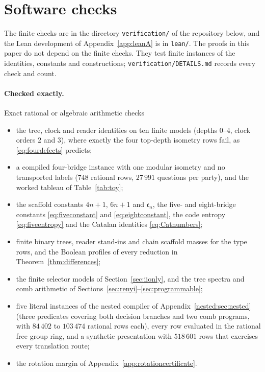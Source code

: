 \section{Software checks}\label{sec:repro}
The finite checks are in the directory \texttt{verification/} of the repository below, and the Lean development of Appendix~\ref{app:leanA} is in \texttt{lean/}. The proofs in this paper do not depend on the finite checks. They test finite instances of the identities, constants and constructions; \texttt{verification/DETAILS.md} records every check and count.

\centerline{\codearchive}

\paragraph{Checked exactly.} Exact rational or algebraic arithmetic checks
\begin{itemize}
\item the tree, clock and reader identities on ten finite models (depths $0$--$4$, clock orders $2$ and $3$), where exactly the four top-depth isometry rows fail, as \eqref{eq:fourdefects} predicts;
\item a compiled four-bridge instance with one modular isometry and no transported labels ($748$ rational rows, $27\,991$ questions per party), and the worked tableau of Table~\ref{tab:toy};
\item the scaffold constants $4n+1$, $6n+1$ and $\mathfrak c_n$, the five- and eight-bridge constants \eqref{eq:fiveconstant} and \eqref{eq:eightconstant}, the code entropy \eqref{eq:fiveentropy} and the Catalan identities \eqref{eq:Catnumbers};
\item finite binary trees, reader stand-ins and chain scaffold masses for the type rows, and the Boolean profiles of every reduction in Theorem~\ref{thm:differences};
\item the finite selector models of Section~\ref{sec:iionly}, and the tree spectra and comb arithmetic of Sections~\ref{sec:renyi}--\ref{sec:programmable};
\item five literal instances of the nested compiler of Appendix~\ref{nested:sec:nested} (three predicates covering both decision branches and two comb programs, with $84\,402$ to $103\,474$ rational rows each), every row evaluated in the rational free group ring, and a synthetic presentation with $518\,601$ rows that exercises every translation route;
\item the rotation margin of Appendix~\ref{app:rotationcertificate}.
\end{itemize}

